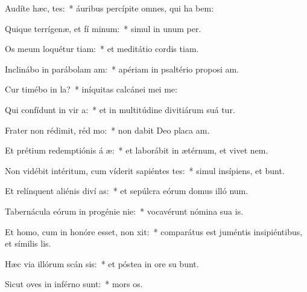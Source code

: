 \item Audíte hæc,  tes:~* áuribus percípite omnes, qui ha bem:
\item Quique terrígenæ, et fí minum:~* simul in unum   per.
\item Os meum loquétur tiam:~* et meditátio cordis  tiam.
\item Inclinábo in parábolam  am:~* apériam in psaltério proposi am.
\item Cur timébo in  la?~* iníquitas calcánei mei  me:
\item Qui confídunt in vir a:~* et in multitúdine divitiárum suá tur.
\item Frater non rédimit, réd mo:~* non dabit Deo placa am.
\item Et prétium redemptiónis á æ:~* et laborábit in ætérnum, et vivet   nem.
\item Non vidébit intéritum, cum víderit sapiéntes tes:~* simul insípiens, et  bunt.
\item Et relínquent aliénis diví as:~* et sepúlcra eórum domus illó  num.
\item Tabernácula eórum in progénie  nie:~* vocavérunt nómina sua   is.
\item Et homo, cum in honóre esset, non xit:~* comparátus est juméntis insipiéntibus, et símilis   lis.
\item Hæc via illórum scán sis:~* et póstea in ore su bunt.
\item Sicut oves in inférno  sunt:~* mors  os.
